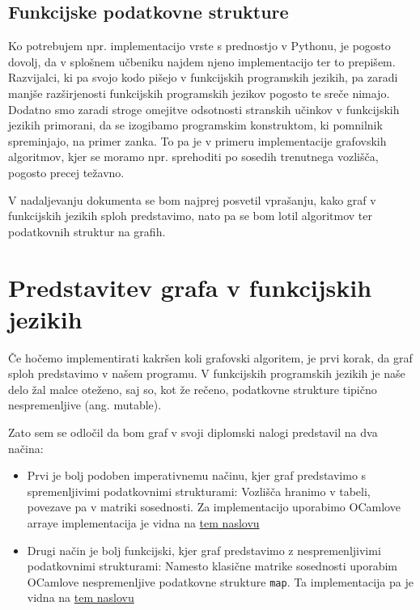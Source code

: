 \documentclass[mat1, tisk]{fmfdelo}
\begin{document}
\subsection{Funkcijske podatkovne strukture}

Ko potrebujem npr. implementacijo vrste s prednostjo v Pythonu, je pogosto dovolj, da v splošnem učbeniku najdem njeno
implementacijo ter to prepišem. Razvijalci, ki pa svojo kodo pišejo v funkcijskih programskih jezikih, pa zaradi manjše
razširjenosti funkcijskih programskih jezikov pogosto te sreče nimajo. 
Dodatno smo zaradi stroge omejitve odsotnosti stranskih učinkov v funkcijskih jezikih primorani, da se izogibamo
programskim konstruktom, ki pomnilnik spreminjajo, na primer zanka. To pa je v primeru implementacije grafovskih
algoritmov, kjer se moramo npr. sprehoditi po sosedih trenutnega vozlišča, pogosto precej težavno.

V nadaljevanju dokumenta se bom najprej posvetil vprašanju, kako graf v funkcijskih jezikih sploh predstavimo, 
nato pa se bom lotil algoritmov ter podatkovnih struktur na grafih.


\section{Predstavitev grafa v funkcijskih jezikih}

Če hočemo implementirati kakršen koli grafovski algoritem, je prvi korak, da graf sploh predstavimo v našem programu. V funkcijskih programskih jezikih je naše delo žal
malce oteženo, saj so, kot že rečeno, podatkovne strukture tipično nespremenljive (ang. mutable).

Zato sem se odločil da bom graf v svoji diplomski nalogi predstavil na dva načina:
\begin{itemize}
  \item Prvi je bolj podoben imperativnemu načinu, kjer graf predstavimo s spremenljivimi podatkovnimi strukturami: Vozlišča hranimo v tabeli, povezave pa v matriki sosednosti.
        Za implementacijo uporabimo OCamlove arraye implementacija je vidna na 
        \href{https://github.com/tjazerzen/parallelisation-of-graph-algorithms-in-functional-programming-languages/blob/predstavitev_grafa_z_arrayi_ter_mnozicami/playground/graph/graph.ml}{tem naslovu}
  \item Drugi način je bolj funkcijski, kjer graf predstavimo z nespremenljivimi podatkovnimi strukturami: Namesto klasične matrike sosednosti uporabim OCamlove nespremenljive
        podatkovne strukture \texttt{map}. Ta implementacija pa je vidna na
        \href{https://github.com/tjazerzen/parallelisation-of-graph-algorithms-in-functional-programming-languages/blob/master/playground/graph/graph.ml}{tem naslovu}
\end{itemize}
\end{document}
